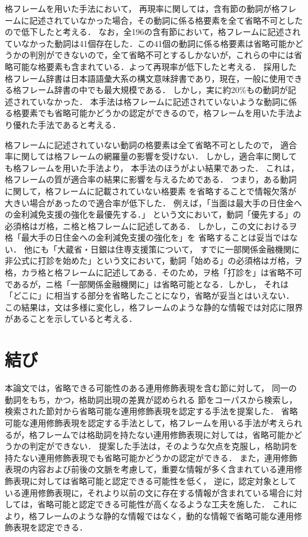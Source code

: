 格フレームを用いた手法において，
再現率に関しては，含有節の動詞が格フレームに記述されていなかった場合，その動詞に係る格要素を全て省略不可としたので低下したと考える．
なお，全196の含有節において，格フレームに記述されていなかった動詞は41個存在した．この41個の動詞に係る格要素は省略可能かどうかの判別ができないので，全て省略不可とするしかないが，これらの中には省略可能な格要素も含まれている．よって再現率が低下したと考える．
採用した格フレーム辞書は日本語語彙大系の構文意味辞書であり，現在，一般に使用できる格フレーム辞書の中でも最大規模である．
しかし，実に約20\%もの動詞が記述されていなかった．
本手法は格フレームに記述されていないような動詞に係る格要素でも省略可能かどうかの認定ができるので，格フレームを用いた手法より優れた手法であると考える．

格フレームに記述されていない動詞の格要素は全て省略不可としたので，
適合率に関しては格フレームの網羅量の影響を受けない．
しかし，適合率に関しても格フレームを用いた手法より，
本手法のほうがよい結果であった．
これは，格フレームの質が適合率の結果に影響を与えるためである．
つまり，ある動詞に関して，格フレームに記載されていない格要素
を省略することで情報欠落が大きい場合があったので適合率が低下した．
例えば，「当面は最大手の日住金への金利減免支援の強化を最優先する．」
という文において，動詞「優先する」の必須格はガ格，ニ格と格フレームに記述してある．
しかし，この文におけるヲ格「最大手の日住金への金利減免支援の強化を」を
省略することは妥当ではない．
他にも「大蔵省・日銀は住専支援策について，
すでに一部関係金融機関に非公式に打診を始めた」という文において，動詞「始める」の必須格はガ格，ヲ格，カラ格と格フレームに記述してある．そのため，ヲ格「打診を」は省略不可であるが，ニ格「一部関係金融機関に」は省略可能となる．しかし，
それは「どこに」に相当する部分を省略したことになり，省略が妥当とはいえない．
この結果は，文は多様に変化し，格フレームのような静的な情報では対応に限界があることを示していると考える．
\section{結び}
本論文では，省略できる可能性のある連用修飾表現を含む節に対して，
同一の動詞をもち，かつ，格助詞出現の差異が認められる
節をコーパスから検索し，検索された節対から省略可能な連用修飾表現を認定する手法を提案した．
省略可能な連用修飾表現を認定する手法として，格フレームを用いる手法が考えられるが，格フレームでは格助詞を持たない連用修飾表現に対しては，省略可能かどうかの判定ができない．
提案した手法は，そのような欠点を克服し，格助詞を持たない連用修飾表現でも省略可能かどうかの認定ができる．
また，連用修飾表現の内容および前後の文脈を考慮して，重要な情報が多く含まれている連用修飾表現に対しては省略可能と認定できる可能性を低く，
逆に，認定対象としている連用修飾表現に，それより以前の文に存在する情報が含まれている場合に対しては，省略可能と認定できる可能性が高くなるような工夫を施した．
これにより，格フレームのような静的な情報ではなく，動的な情報で省略可能な連用修飾表現を認定できる．

